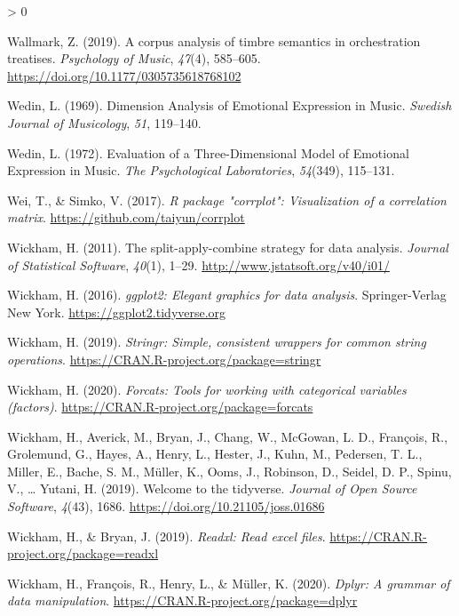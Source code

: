 \documentclass[
  english,
  man]{apa6}
\newlength{\cslhangindent}
\newenvironment{CSLReferences}[2] %
 {%
  \setlength{\parindent}{0pt}
  \ifodd #1 \everypar{\setlength{\hangindent}{\cslhangindent}}\ignorespaces\fi
  \ifnum #2 > 0
  \setlength{\parskip}{#2\baselineskip}
  \fi
 }%
 {}
\begin{document}
\begin{CSLReferences}{1}{0}
\leavevmode\hypertarget{ref-Wallmark2019}{}%
Wallmark, Z. (2019). {A corpus analysis of timbre semantics in orchestration treatises}. \emph{Psychology of Music}, \emph{47}(4), 585--605. \url{https://doi.org/10.1177/0305735618768102}

\leavevmode\hypertarget{ref-Wedin1969}{}%
Wedin, L. (1969). {Dimension Analysis of Emotional Expression in Music}. \emph{Swedish Journal of Musicology}, \emph{51}, 119--140.

\leavevmode\hypertarget{ref-Wedin1972}{}%
Wedin, L. (1972). {Evaluation of a Three-Dimensional Model of Emotional Expression in Music}. \emph{The Psychological Laboratories}, \emph{54}(349), 115--131.

\leavevmode\hypertarget{ref-R-corrplot2017}{}%
Wei, T., \& Simko, V. (2017). \emph{R package "corrplot": Visualization of a correlation matrix}. \url{https://github.com/taiyun/corrplot}

\leavevmode\hypertarget{ref-R-plyr}{}%
Wickham, H. (2011). The split-apply-combine strategy for data analysis. \emph{Journal of Statistical Software}, \emph{40}(1), 1--29. \url{http://www.jstatsoft.org/v40/i01/}

\leavevmode\hypertarget{ref-R-ggplot2}{}%
Wickham, H. (2016). \emph{ggplot2: Elegant graphics for data analysis}. Springer-Verlag New York. \url{https://ggplot2.tidyverse.org}

\leavevmode\hypertarget{ref-R-stringr}{}%
Wickham, H. (2019). \emph{Stringr: Simple, consistent wrappers for common string operations}. \url{https://CRAN.R-project.org/package=stringr}

\leavevmode\hypertarget{ref-R-forcats}{}%
Wickham, H. (2020). \emph{Forcats: Tools for working with categorical variables (factors)}. \url{https://CRAN.R-project.org/package=forcats}

\leavevmode\hypertarget{ref-R-tidyverse}{}%
Wickham, H., Averick, M., Bryan, J., Chang, W., McGowan, L. D., François, R., Grolemund, G., Hayes, A., Henry, L., Hester, J., Kuhn, M., Pedersen, T. L., Miller, E., Bache, S. M., Müller, K., Ooms, J., Robinson, D., Seidel, D. P., Spinu, V., \ldots{} Yutani, H. (2019). Welcome to the {tidyverse}. \emph{Journal of Open Source Software}, \emph{4}(43), 1686. \url{https://doi.org/10.21105/joss.01686}

\leavevmode\hypertarget{ref-R-readxl}{}%
Wickham, H., \& Bryan, J. (2019). \emph{Readxl: Read excel files}. \url{https://CRAN.R-project.org/package=readxl}

\leavevmode\hypertarget{ref-R-dplyr}{}%
Wickham, H., François, R., Henry, L., \& Müller, K. (2020). \emph{Dplyr: A grammar of data manipulation}. \url{https://CRAN.R-project.org/package=dplyr}


\end{CSLReferences}
\end{document}

